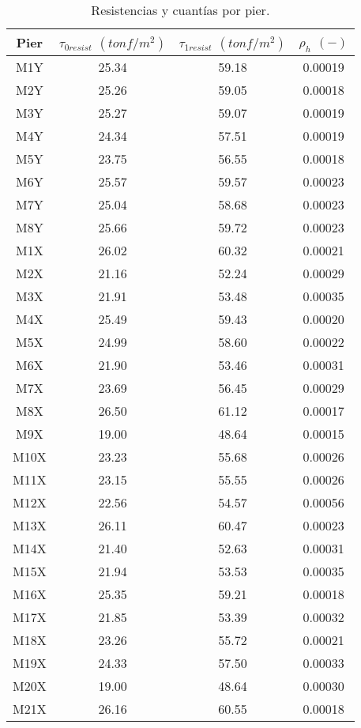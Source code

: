 \begin{table}[H]
  \centering
  \caption{Resistencias y cuantías por pier.}
  \begin{tabular}{cccc}
    \hline
    \textbf{Pier} & \boldmath{}\textbf{$\tau_{0resist} $ $ (tonf/m^2)$}\unboldmath{} & \boldmath{}\textbf{$\tau_{1resist} $ $ (tonf/m^2)$}\unboldmath{} & \boldmath{}\textbf{$\rho_h$ $ (-)$}\unboldmath{} \bigstrut\\
    \hline
    M1Y   & 25.34 & 59.18 & 0.00019 \bigstrut[t]\\
    M2Y   & 25.26 & 59.05 & 0.00018 \\
    M3Y   & 25.27 & 59.07 & 0.00019 \\
    M4Y   & 24.34 & 57.51 & 0.00019 \\
    M5Y   & 23.75 & 56.55 & 0.00018 \\
    M6Y   & 25.57 & 59.57 & 0.00023 \\
    M7Y   & 25.04 & 58.68 & 0.00023 \\
    M8Y   & 25.66 & 59.72 & 0.00023 \\
    M1X   & 26.02 & 60.32 & 0.00021 \\
    M2X   & 21.16 & 52.24 & 0.00029 \\
    M3X   & 21.91 & 53.48 & 0.00035 \\
    M4X   & 25.49 & 59.43 & 0.00020 \\
    M5X   & 24.99 & 58.60 & 0.00022 \\
    M6X   & 21.90 & 53.46 & 0.00031 \\
    M7X   & 23.69 & 56.45 & 0.00029 \\
    M8X   & 26.50 & 61.12 & 0.00017 \\
    M9X   & 19.00 & 48.64 & 0.00015 \\
    M10X  & 23.23 & 55.68 & 0.00026 \\
    M11X  & 23.15 & 55.55 & 0.00026 \\
    M12X  & 22.56 & 54.57 & 0.00056 \\
    M13X  & 26.11 & 60.47 & 0.00023 \\
    M14X  & 21.40 & 52.63 & 0.00031 \\
    M15X  & 21.94 & 53.53 & 0.00035 \\
    M16X  & 25.35 & 59.21 & 0.00018 \\
    M17X  & 21.85 & 53.39 & 0.00032 \\
    M18X  & 23.26 & 55.72 & 0.00021 \\
    M19X  & 24.33 & 57.50 & 0.00033 \\
    M20X  & 19.00 & 48.64 & 0.00030 \\
    M21X  & 26.16 & 60.55 & 0.00018 \bigstrut[b]\\
    \hline
  \end{tabular}
  \label{resist}
\end{table}


